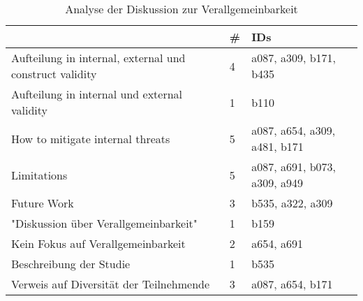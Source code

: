 \begin{table}[h!]
    \begin{tabular}{ l | l | l  }
        & \# & IDs \\
        \hline
        Aufteilung in internal, external und construct validity & 4 & a087, a309, b171, b435 \\
        Aufteilung in internal und external validity & 1 & b110 \\
        How to mitigate internal threats & 5 &  a087, a654, a309, a481, b171 \\
        Limitations & 5 & a087, a691, b073, a309, a949 \\
        Future Work & 3 & b535, a322, a309 \\
        "Diskussion über Verallgemeinbarkeit" & 1 & b159 \\
        Kein Fokus auf Verallgemeinbarkeit & 2 & a654, a691 \\
        Beschreibung der Studie & 1 & b535 \\
        Verweis auf Diversität der Teilnehmende & 3 & a087, a654, b171 \\
    \end{tabular}
    \caption{Analyse der Diskussion zur Verallgemeinbarkeit}
    \label{table:threats-of-validity}
\end{table}

